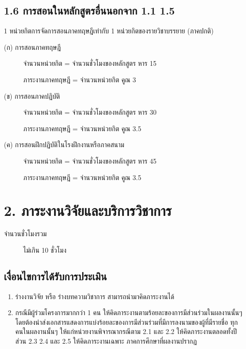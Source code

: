 \documentclass[a4paper,12pt,english]{sphinxmanual}
\begin{document}
\section{1.6 การสอนในหลักสูตรอื่นนอกจาก 1.1 \sphinxhyphen{} 1.5}
\label{\detokenize{1teaching:id21}}
1 หน่วยกิตการจัดการสอนภาคทฤษฎีเท่ากับ 1 หน่วยกิตของรายวิชาบรรยาย (ภาคปกติ)
\begin{description}
\item[{(ก) การสอนภาคทฤษฎี}] \leavevmode
จำนวนหน่วยกิต = จำนวนชั่วโมงของหลักสูตร หาร 15

ภาระงานภาคทฤษฎี = จำนวนหน่วยกิต คูณ 3

\item[{(ข) การสอนภาคปฏิบัติ}] \leavevmode
จำนวนหน่วยกิต = จำนวนชั่วโมงของหลักสูตร หาร 30

ภาระงานภาคทฤษฎี = จำนวนหน่วยกิต คูณ 3.5

\item[{(ค) การสอนฝึกปฏิบัติในโรงฝึกงานหรือภาคสนาม}] \leavevmode
จำนวนหน่วยกิต = จำนวนชั่วโมงของหลักสูตร หาร 45

ภาระงานภาคทฤษฎี = จำนวนหน่วยกิต คูณ 3.5

\end{description}


\chapter{2. ภาระงานวิจัยและบริการวิชาการ}
\label{\detokenize{2research:id1}}\label{\detokenize{2research::doc}}\begin{description}
\item[{จำนวนชั่วโมงรวม}] \leavevmode
ไม่เกิน 10 ชั่วโมง

\end{description}


\section{เงื่อนไขการได้รับการประเมิน}
\label{\detokenize{2research:id2}}\begin{enumerate}
%
\item {} 
ร่างงานวิจัย หรือ ร่างบทความวิชาการ  สามารถนำมาคิดภาระงานได้

\item {} 
กรณีมีผู้ร่วมโครงการมากกว่า 1 คน ให้คิดภาระงานตามร้อยละของการมีส่วนร่วมในผลงานนั้นๆ โดยต้องนำส่งเอกสารแสดงการแบ่งร้อยละของการมีส่วนร่วมที่มีการลงนามของผู้ที่มีรายชื่อ ทุกคนในผลงานนั้นๆ ให้แก่หน่วยงานพิจารณากรณีตาม 2.1 และ 2.2 ให้คิดภาระงานตลอดทั้งปี ส่วน 2.3 2.4 และ 2.5 ให้คิดภาระงานเฉพาะ ภาคการศึกษาที่ผลงานปรากฏ

\end{enumerate}
\end{document}
